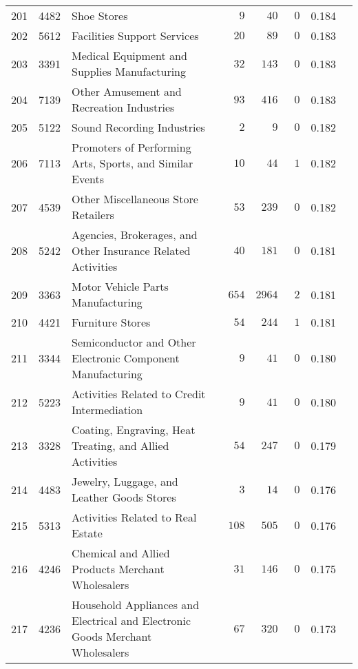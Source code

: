 \documentclass[9pt, oneside]{article}   	%
\begin{document}
\begin{longtable}{lcp{3 in}ccccc}
201  & 4482 & Shoe Stores & $\phantom{000}9$ & $\phantom{00}40$ & $\phantom{0}0$ & 0.184 \\
202  & 5612 & Facilities Support Services & $\phantom{00}20$ & $\phantom{00}89$ & $\phantom{0}0$ & 0.183 \\
203  & 3391 & Medical Equipment and Supplies Manufacturing & $\phantom{00}32$ & $\phantom{0}143$ & $\phantom{0}0$ & 0.183 \\
204  & 7139 & Other Amusement and Recreation Industries & $\phantom{00}93$ & $\phantom{0}416$ & $\phantom{0}0$ & 0.183 \\
205  & 5122 & Sound Recording Industries & $\phantom{000}2$ & $\phantom{000}9$ & $\phantom{0}0$ & 0.182 \\
206  & 7113 & Promoters of Performing Arts, Sports, and Similar Events & $\phantom{00}10$ & $\phantom{00}44$ & $\phantom{0}1$ & 0.182 \\
207  & 4539 & Other Miscellaneous Store Retailers & $\phantom{00}53$ & $\phantom{0}239$ & $\phantom{0}0$ & 0.182 \\
208  & 5242 & Agencies, Brokerages, and Other Insurance Related Activities & $\phantom{00}40$ & $\phantom{0}181$ & $\phantom{0}0$ & 0.181 \\
209  & 3363 & Motor Vehicle Parts Manufacturing & $\phantom{0}654$ & $2964$ & $\phantom{0}2$ & 0.181 \\
210  & 4421 & Furniture Stores & $\phantom{00}54$ & $\phantom{0}244$ & $\phantom{0}1$ & 0.181 \\
211  & 3344 & Semiconductor and Other Electronic Component Manufacturing & $\phantom{000}9$ & $\phantom{00}41$ & $\phantom{0}0$ & 0.180 \\
212  & 5223 & Activities Related to Credit Intermediation & $\phantom{000}9$ & $\phantom{00}41$ & $\phantom{0}0$ & 0.180 \\
213  & 3328 & Coating, Engraving, Heat Treating, and Allied Activities & $\phantom{00}54$ & $\phantom{0}247$ & $\phantom{0}0$ & 0.179 \\
214  & 4483 & Jewelry, Luggage, and Leather Goods Stores & $\phantom{000}3$ & $\phantom{00}14$ & $\phantom{0}0$ & 0.176 \\
215  & 5313 & Activities Related to Real Estate & $\phantom{0}108$ & $\phantom{0}505$ & $\phantom{0}0$ & 0.176 \\
216  & 4246 & Chemical and Allied Products Merchant Wholesalers & $\phantom{00}31$ & $\phantom{0}146$ & $\phantom{0}0$ & 0.175 \\
217  & 4236 & Household Appliances and Electrical and Electronic Goods Merchant Wholesalers & $\phantom{00}67$ & $\phantom{0}320$ & $\phantom{0}0$ & 0.173 \\

\end{longtable}
\end{document}
